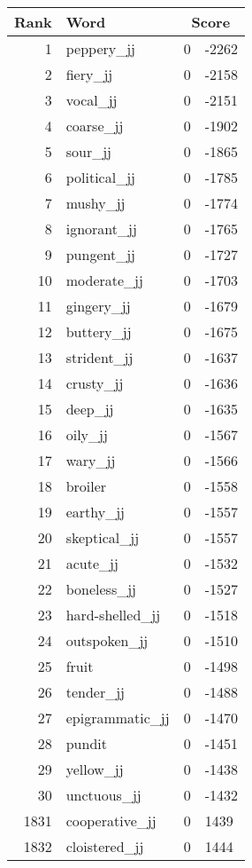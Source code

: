 \begin{longtable}[!htbp]{| rlr@{.}l |}
    \hline
    \textbf{Rank} & \textbf{Word} & \multicolumn{2}{c|}{\textbf{Score}} \\
    \hline
    \endhead
    1 & peppery\_jj & 0 & -2262 \\
    2 & fiery\_jj & 0 & -2158 \\
    3 & vocal\_jj & 0 & -2151 \\
    4 & coarse\_jj & 0 & -1902 \\
    5 & sour\_jj & 0 & -1865 \\
    6 & political\_jj & 0 & -1785 \\
    7 & mushy\_jj & 0 & -1774 \\
    8 & ignorant\_jj & 0 & -1765 \\
    9 & pungent\_jj & 0 & -1727 \\
    10 & moderate\_jj & 0 & -1703 \\
    11 & gingery\_jj & 0 & -1679 \\
    12 & buttery\_jj & 0 & -1675 \\
    13 & strident\_jj & 0 & -1637 \\
    14 & crusty\_jj & 0 & -1636 \\
    15 & deep\_jj & 0 & -1635 \\
    16 & oily\_jj & 0 & -1567 \\
    17 & wary\_jj & 0 & -1566 \\
    18 & broiler & 0 & -1558 \\
    19 & earthy\_jj & 0 & -1557 \\
    20 & skeptical\_jj & 0 & -1557 \\
    21 & acute\_jj & 0 & -1532 \\
    22 & boneless\_jj & 0 & -1527 \\
    23 & hard-shelled\_jj & 0 & -1518 \\
    24 & outspoken\_jj & 0 & -1510 \\
    25 & fruit & 0 & -1498 \\
    26 & tender\_jj & 0 & -1488 \\
    27 & epigrammatic\_jj & 0 & -1470 \\
    28 & pundit & 0 & -1451 \\
    29 & yellow\_jj & 0 & -1438 \\
    30 & unctuous\_jj & 0 & -1432 \\
    1831 & cooperative\_jj & 0 & 1439 \\
    1832 & cloistered\_jj & 0 & 1444 \\

\end{longtable}
